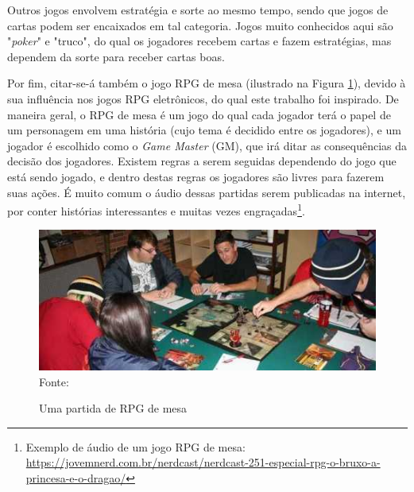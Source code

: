 \documentclass[
	12pt,					%
	openright,				%
	oneside,				%
	a4paper,				%
	bibjustif,				%
	chapter=TITLE,			%
	english,				%
	brazil,					%
	]{abntex2}
\newcommand{\source}[1]{\small Fonte: {#1}}
\begin{document}
		Outros jogos envolvem estratégia e sorte ao mesmo tempo,
		sendo que jogos de cartas podem ser encaixados em tal categoria.
		Jogos muito conhecidos aqui são "\textit{poker}" e "truco",
		do qual os jogadores recebem cartas e fazem estratégias,
		mas dependem da sorte para receber cartas boas.
		
		Por fim, citar-se-á também o jogo RPG de mesa
		(ilustrado na Figura \ref{fig:tableRpg}),
		devido à sua influência nos jogos RPG eletrônicos,
		do qual este trabalho foi inspirado.
		De maneira geral, o RPG de mesa é um jogo do qual cada jogador terá o papel de um personagem em uma história
		(cujo tema é decidido entre os jogadores),
		e um jogador é escolhido como o \textit{Game Master} (GM),
		que irá ditar as consequências da decisão dos jogadores.
		Existem regras a serem seguidas dependendo do jogo que está sendo jogado,
		e dentro destas regras os jogadores são livres para fazerem suas ações.
		É muito comum o áudio dessas partidas serem publicadas na internet,
		por conter histórias interessantes e muitas vezes engraçadas\footnote{Exemplo de áudio de um jogo RPG de mesa: \url{https://jovemnerd.com.br/nerdcast/nerdcast-251-especial-rpg-o-bruxo-a-princesa-e-o-dragao/}}.
		
		\begin{figure}[ht!]
			\caption{Uma partida de RPG de mesa}
			\centering
			\includegraphics[scale=1.0]{img/RPG_de_mesa.jpg}\\
			\vspace{0.5mm}
			\source{}
			\label{fig:tableRpg}
		\end{figure}
		
\end{document}
